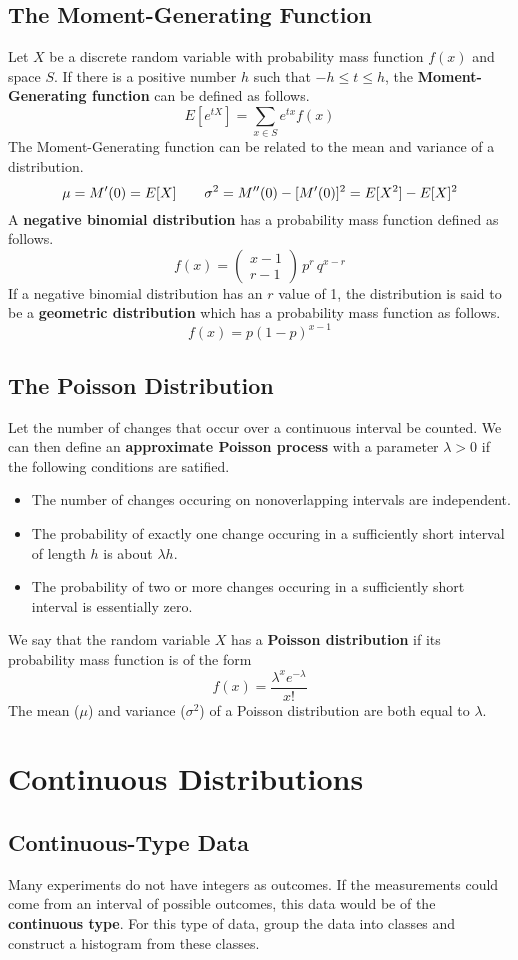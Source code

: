 \documentclass{article}
\begin{document}
\subsection{The Moment-Generating Function}
Let \(X\) be a discrete random variable with probability mass function \(f(x)\) and space \(S\). If there is a positive number \(h\) such that \(-h \leq t \leq h\), the \textbf{Moment-Generating function} can be defined as follows.
\[E[e^{tX}]=\sum\limits_{x\in S}e^{tx}f(x)\]
The Moment-Generating function can be related to the mean and variance of a distribution.
\[\mu=M'(0)=E[X]\hspace{7 mm}\sigma^2=M''(0)-[M'(0)]^2=E[X^2]-E[X]^2\]
A \textbf{negative binomial distribution} has a probability mass function defined as follows.
\[f(x)=\left(\begin{matrix}x-1\\r-1\end{matrix}\right)\,p^r\,q^{x-r}\]
If a negative binomial distribution has an \(r\) value of 1, the distribution is said to be a \textbf{geometric distribution} which has a probability mass function as follows.
\[f(x)=p(1-p)^{x-1}\]
\subsection{The Poisson Distribution}
Let the number of changes that occur over a continuous interval be counted. We can then define an \textbf{approximate Poisson process} with a parameter \(\lambda>0\) if the following conditions are satified.
\begin{itemize}
    \item The number of changes occuring on nonoverlapping intervals are independent.
    \item The probability of exactly one change occuring in a sufficiently short interval of length \(h\) is about \(\lambda h\).
    \item The probability of two or more changes occuring in a sufficiently short interval is essentially zero.
\end{itemize}
We say that the random variable \(X\) has a \textbf{Poisson distribution} if its probability mass function is of the form
\[f(x)=\frac{\lambda^xe^{-\lambda}}{x!}\]
The mean (\(\mu\)) and variance (\(\sigma^2\)) of a Poisson distribution are both equal to \(\lambda\).
\section{Continuous Distributions}
\subsection{Continuous-Type Data}
Many experiments do not have integers as outcomes. If the measurements could come from an interval of possible outcomes, this data would be of the \textbf{continuous type}. For this type of data, group the data into classes and construct a histogram from these classes.
\end{document}
